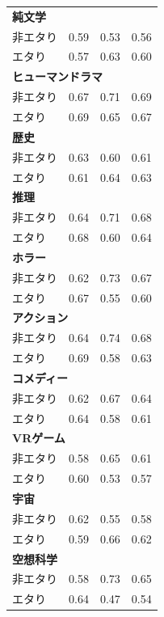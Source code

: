 \documentclass[uplatex, dvipdfmx, 11pt, a4paper, report]{jsbook}
\begin{document}
\begin{longtable}{lrrr}
\multicolumn{4}{l}{\textbf{純文学}} \\
\quad 非エタり & 0.59 & 0.53 & 0.56 \\
\quad エタり & 0.57 & 0.63 & 0.60 \\ \hline

\multicolumn{4}{l}{\textbf{ヒューマンドラマ}} \\
\quad 非エタり & 0.67 & 0.71 & 0.69 \\
\quad エタり & 0.69 & 0.65 & 0.67 \\ \hline

\multicolumn{4}{l}{\textbf{歴史}} \\
\quad 非エタり & 0.63 & 0.60 & 0.61 \\
\quad エタり & 0.61 & 0.64 & 0.63 \\ \hline

\multicolumn{4}{l}{\textbf{推理}} \\
\quad 非エタり & 0.64 & 0.71 & 0.68 \\
\quad エタり & 0.68 & 0.60 & 0.64 \\ \hline

\multicolumn{4}{l}{\textbf{ホラー}} \\
\quad 非エタり & 0.62 & 0.73 & 0.67 \\
\quad エタり & 0.67 & 0.55 & 0.60 \\ \hline

\multicolumn{4}{l}{\textbf{アクション}} \\
\quad 非エタり & 0.64 & 0.74 & 0.68 \\
\quad エタり & 0.69 & 0.58 & 0.63 \\ \hline

\multicolumn{4}{l}{\textbf{コメディー}} \\
\quad 非エタり & 0.62 & 0.67 & 0.64 \\
\quad エタり & 0.64 & 0.58 & 0.61 \\ \hline

\multicolumn{4}{l}{\textbf{VRゲーム}} \\
\quad 非エタり & 0.58 & 0.65 & 0.61 \\
\quad エタり & 0.60 & 0.53 & 0.57 \\ \hline

\multicolumn{4}{l}{\textbf{宇宙}} \\
\quad 非エタり & 0.62 & 0.55 & 0.58 \\
\quad エタり & 0.59 & 0.66 & 0.62 \\ \hline

\multicolumn{4}{l}{\textbf{空想科学}} \\
\quad 非エタり & 0.58 & 0.73 & 0.65 \\
\quad エタり & 0.64 & 0.47 & 0.54 \\ \hline


\end{longtable}
\end{document}
